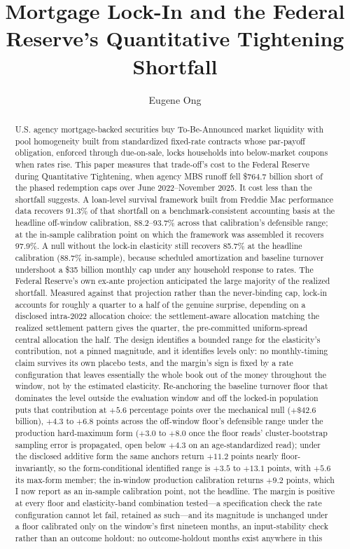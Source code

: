 \documentclass[12pt]{article}
\title{Mortgage Lock-In and the Federal Reserve's Quantitative Tightening Shortfall}
\author{Eugene Ong}
\affil{Carnegie Mellon University}
\date{}
\begin{document}
\maketitle
\begin{abstract}
\noindent U.S. agency mortgage-backed securities buy To-Be-Announced market liquidity with pool homogeneity built from standardized fixed-rate contracts whose par-payoff obligation, enforced through due-on-sale, locks households into below-market coupons when rates rise. This paper measures that trade-off's cost to the Federal Reserve during Quantitative Tightening, when agency MBS runoff fell \$764.7 billion short of the phased redemption caps over June 2022--November 2025. It cost less than the shortfall suggests. A loan-level survival framework built from Freddie Mac performance data recovers 91.3\% of that shortfall on a benchmark-consistent accounting basis at the headline off-window calibration, 88.2--93.7\% across that calibration's defensible range; at the in-sample calibration point on which the framework was assembled it recovers 97.9\%. A null without the lock-in elasticity still recovers 85.7\% at the headline calibration (88.7\% in-sample), because scheduled amortization and baseline turnover undershoot a \$35 billion monthly cap under any household response to rates. The Federal Reserve's own ex-ante projection anticipated the large majority of the realized shortfall. Measured against that projection rather than the never-binding cap, lock-in accounts for roughly a quarter to a half of the genuine surprise, depending on a disclosed intra-2022 allocation choice: the settlement-aware allocation matching the realized settlement pattern gives the quarter, the pre-committed uniform-spread central allocation the half. The design identifies a bounded range for the elasticity's contribution, not a pinned magnitude, and it identifies levels only: no monthly-timing claim survives its own placebo tests, and the margin's sign is fixed by a rate configuration that leaves essentially the whole book out of the money throughout the window, not by the estimated elasticity. Re-anchoring the baseline turnover floor that dominates the level outside the evaluation window and off the locked-in population puts that contribution at $+5.6$ percentage points over the mechanical null ($+\$42.6$ billion), $+4.3$ to $+6.8$ points across the off-window floor's defensible range under the production hard-maximum form ($+3.0$ to $+8.0$ once the floor reads' cluster-bootstrap sampling error is propagated, open below $+4.3$ on an age-standardized read); under the disclosed additive form the same anchors return $+11.2$ points nearly floor-invariantly, so the form-conditional identified range is $+3.5$ to $+13.1$ points, with $+5.6$ its max-form member; the in-window production calibration returns $+9.2$ points, which I now report as an in-sample calibration point, not the headline. The margin is positive at every floor and elasticity-band combination tested---a specification check the rate configuration cannot let fail, retained as such---and its magnitude is unchanged under a floor calibrated only on the window's first nineteen months, an input-stability check rather than an outcome holdout: no outcome-holdout months exist anywhere in this 
\end{abstract}
\end{document}
